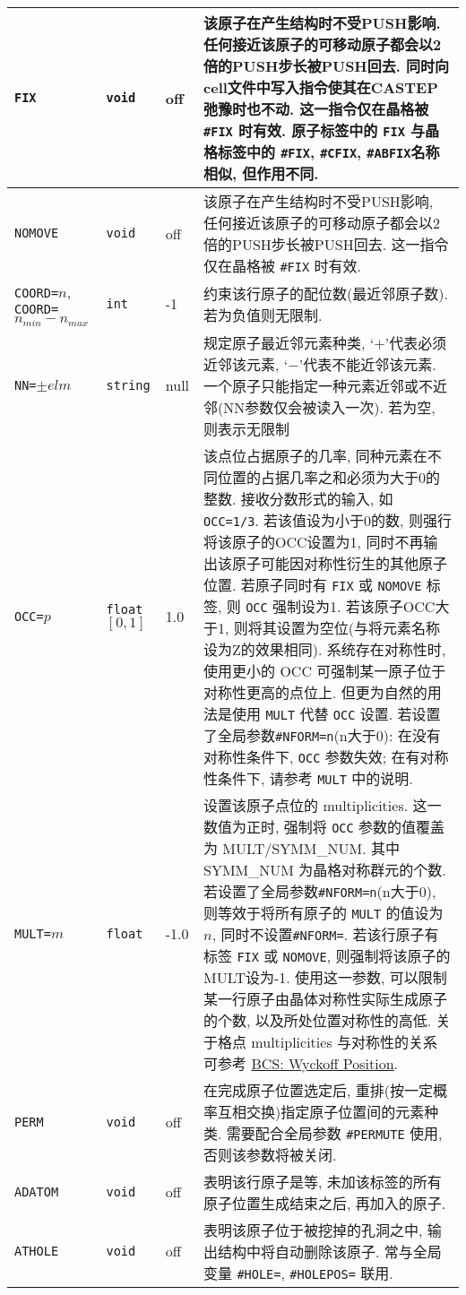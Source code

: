 \documentclass[a4paper, 10pt]{article}
\begin{document}
\begin{center}
\begin{longtable}{m{10em}|m{4em}<{\centering}|m{3em}<{\centering}|m{15em}}
\midrule
\verb|FIX| & \verb|void| & off & 该原子在产生结构时不受PUSH影响. 任何接近该原子的可移动原子都会以2倍的PUSH步长被PUSH回去. 同时向cell文件中写入指令使其在CASTEP弛豫时也不动. 这一指令仅在晶格被 \verb|#FIX| 时有效. 原子标签中的 \verb|FIX| 与晶格标签中的 \verb|#FIX|, \verb|#CFIX|, \verb|#ABFIX|名称相似, 但作用不同. \\
\midrule
\verb|NOMOVE| & \verb|void| & off & 该原子在产生结构时不受PUSH影响, 任何接近该原子的可移动原子都会以2倍的PUSH步长被PUSH回去. 这一指令仅在晶格被 \verb|#FIX| 时有效.\\
\midrule
\verb|COORD=|\(n\),\hspace{5em} \verb|COORD=|\(n_{min}-n_{max}\) & \verb|int| & -1 & 约束该行原子的配位数(最近邻原子数). 若为负值则无限制.\\
\midrule
\verb|NN=|\(\pm{}elm\)  & \verb|string| & null & 规定原子最近邻元素种类, `\(+\)'代表必须近邻该元素, `\(-\)'代表不能近邻该元素. 一个原子只能指定一种元素近邻或不近邻(NN参数仅会被读入一次). 若为空, 则表示无限制\\
\midrule
\verb|OCC=|\(p\) & \verb|float| \([0,1]\) & 1.0 & 该点位占据原子的几率, 同种元素在不同位置的占据几率之和必须为大于0的整数. 接收分数形式的输入, 如 \verb|OCC=1/3|. 若该值设为小于0的数, 则强行将该原子的OCC设置为1, 同时不再输出该原子可能因对称性衍生的其他原子位置. 若原子同时有 \verb|FIX| 或 \verb|NOMOVE| 标签, 则 \verb|OCC| 强制设为1. 若该原子OCC大于1, 则将其设置为空位(与将元素名称设为Z的效果相同). 系统存在对称性时, 使用更小的 OCC 可强制某一原子位于对称性更高的点位上. 但更为自然的用法是使用 \verb|MULT| 代替 \verb|OCC| 设置. 若设置了全局参数\verb|#NFORM=n|(n大于0): 在没有对称性条件下, \verb|OCC| 参数失效; 在有对称性条件下, 请参考 \verb|MULT| 中的说明. \\
\midrule
\verb|MULT=|\(m\) & \verb|float| & -1.0 & 设置该原子点位的 multiplicities. 这一数值为正时, 强制将 \verb|OCC| 参数的值覆盖为 MULT/SYMM\_NUM. 其中 SYMM\_NUM 为晶格对称群元的个数. 若设置了全局参数\verb|#NFORM=n|(n大于0), 则等效于将所有原子的 \verb|MULT| 的值设为\(n\), 同时不设置\verb|#NFORM=|. 若该行原子有标签 \verb|FIX| 或 \verb|NOMOVE|, 则强制将该原子的MULT设为-1. 使用这一参数, 可以限制某一行原子由晶体对称性实际生成原子的个数, 以及所处位置对称性的高低. 关于格点 multiplicities 与对称性的关系可参考 \href{https://www.cryst.ehu.es/cryst/get_set.html}{BCS: Wyckoff Position}.\\
\midrule
\verb|PERM| & \verb|void| & off & 在完成原子位置选定后, 重排(按一定概率互相交换)指定原子位置间的元素种类. 需要配合全局参数 \verb|#PERMUTE| 使用, 否则该参数将被关闭.\\
\midrule
\verb|ADATOM| & \verb|void| & off & 表明该行原子是等, 未加该标签的所有原子位置生成结束之后, 再加入的原子.\\
\midrule
\verb|ATHOLE| & \verb|void| & off & 表明该原子位于被挖掉的孔洞之中, 输出结构中将自动删除该原子. 常与全局变量 \verb|#HOLE=|, \verb|#HOLEPOS=| 联用.\\
\bottomrule
\end{longtable}
\end{center}
\end{document}
